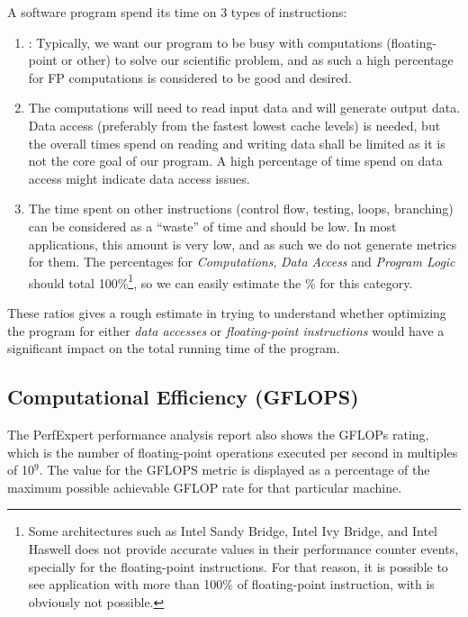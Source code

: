 A software program spend its time on 3 types of instructions:

\begin{enumerate}
  \item  {}: Typically, we want our program to be busy with computations (floating-point or other) to solve our scientific problem, and as such a high percentage for FP computations is considered to be good and desired.
  \item  {} The computations will need to read input data and will generate output data. Data access (preferably from the fastest lowest cache levels) is needed, but the overall times spend on reading and writing data shall be limited as it is not the core goal of our program. A high percentage of time spend on data access might indicate data access issues.
  \item  {} The time spent on other instructions (control flow, testing, loops, branching) can be considered as a ``waste'' of time and should be low. In most applications, this amount is very low, and as such we do not generate metrics for them. The percentages for \emph{Computations}, \emph{Data Access} and \emph{Program Logic} 
  should total 100\%\footnote{Some architectures such as Intel Sandy Bridge, Intel Ivy Bridge, and Intel Haswell does not provide accurate values in their performance counter events, specially for the floating-point instructions. For that reason, it is possible to see application with more than 100\% of floating-point instruction, with is obviously not possible.}, so we can easily estimate the \% for this category.
\end{enumerate}

These ratios gives a rough estimate in trying to understand whether optimizing the program for either \emph{data accesses} or \emph{floating-point instructions} would have a significant impact on the total running time of the program.

\subsection{Computational Efficiency (GFLOPS)}
\label{subsec:Computational_Efficiancy}

The PerfExpert performance analysis report also shows the GFLOPs rating, which is the number of floating-point operations executed per second in multiples of 10${}^{9}$. The value for the GFLOPS metric is displayed as a percentage of the maximum possible achievable GFLOP rate for that particular machine.

